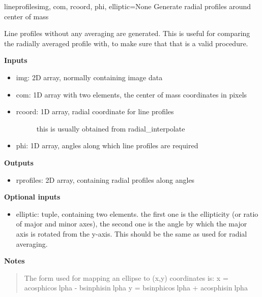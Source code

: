 \documentclass[letterpaper,10pt,english]{manual}
\begin{document}
\hypertarget{odysseus.imageprocess.lineprofiles}{}\begin{funcdesc}{lineprofiles}{img, com, rcoord, phi, elliptic=None}
Generate radial profiles around center of mass

Line profiles without any averaging are generated. This is useful for
comparing the radially averaged profile with, to make sure that that is a
valid procedure.

\textbf{Inputs}
\begin{itemize}
\item {} 
img: 2D array, normally containing image data

\item {} 
com: 1D array with two elements, the center of mass coordinates in pixels

\item {} \begin{description}
\item[rcoord: 1D array, radial coordinate for line profiles] \leavevmode
this is usually obtained from radial\_interpolate

\end{description}

\item {} 
phi: 1D array, angles along which line profiles are required

\end{itemize}

\textbf{Outputs}
\begin{itemize}
\item {} 
rprofiles: 2D array, containing radial profiles along angles

\end{itemize}

\textbf{Optional inputs}
\begin{itemize}
\item {} 
elliptic: tuple, containing two elements. the first one is the
ellipticity (or ratio of major and minor axes), the second one is the
angle by which the major axis is rotated from the y-axis. This should
be the same as used for radial averaging.

\end{itemize}

\textbf{Notes}
\begin{quote}

The form used for mapping an ellipse to (x,y) coordinates is:
x = acosphicoslpha - bsinphisinlpha
y = bsinphicoslpha + acosphisinlpha
\end{quote}
\end{funcdesc}
\end{document}
